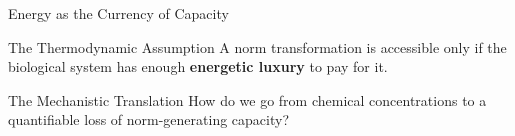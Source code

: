 \documentclass[aspectratio=169,11pt,xcolor=table]{beamer}
\begin{document}
	\begin{frame}{Energy as the Currency of Capacity}
		
		\vspace{0.7em}
		
		\begin{block}{The Thermodynamic Assumption}
			A norm transformation is accessible only if the biological system has enough \textbf{energetic luxury} to pay for it.
		\end{block}
		
		\begin{block}{The Mechanistic Translation}
			How do we go from chemical concentrations to a quantifiable loss of norm-generating capacity?
		\end{block}
		
	\end{frame}
	
\end{document}
